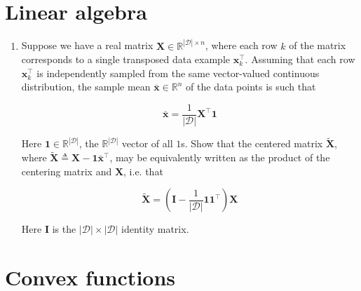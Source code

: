 \documentclass{article}
\numberwithin{equation}{section}
\begin{document}
\section{Linear algebra}

\begin{enumerate}
    \item
    Suppose we have a real matrix $ \mathbf{X} \in
    \mathbb{R}^{|\mathcal{D}| \times n} $, where each row $ k $ of the matrix
    corresponds to a single transposed data example $ \mathbf{x}_k^\top $.
    Assuming that each row $ \mathbf{x}_k^\top $ is independently sampled from
    the same vector-valued continuous distribution, the sample mean
    $ \bar{\mathbf{x}} \in \mathbb{R}^n $ of the data points is such that
    
    \begin{equation*}
        \bar{\mathbf{x}} = \frac{1}{|\mathcal{D}|}\mathbf{X}^\top\mathbf{1}
    \end{equation*}

    Here $ \mathbf{1} \in \mathbb{R}^{|\mathcal{D}|} $, the
    $ \mathbb{R}^{|\mathcal{D}|} $ vector of all $ 1 $s. Show that the centered
    matrix $ \tilde{\mathbf{X}} $, where $ \tilde{\mathbf{X}} \triangleq
    \mathbf{X} - \mathbf{1}\bar{\mathbf{x}}^\top $, may be equivalently written
    as the product of the centering matrix and $ \mathbf{X} $, i.e. that

    \begin{equation*}
        \tilde{\mathbf{X}} = \left(\mathbf{I} - \frac{1}{|\mathcal{D}|}
        \mathbf{11}^\top\right)\mathbf{X}
    \end{equation*}

    Here $ \mathbf{I} $ is the $ |\mathcal{D}| \times |\mathcal{D}| $ identity
    matrix.
\end{enumerate}

\section{Convex functions}
\end{document}
